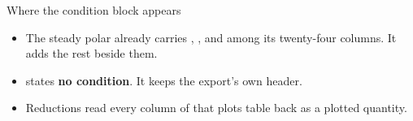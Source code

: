\begin{frame}{Where the condition block appears}
\begin{itemize}
  \item The steady polar already carries , ,
         and  among its twenty-four columns. It adds
        the rest beside them.
  \item {} states \textbf{no condition}.
        It keeps the export's own header.
  \item Reductions read every column of that plots table back as a plotted
        quantity.
\end{itemize}
\end{frame}
